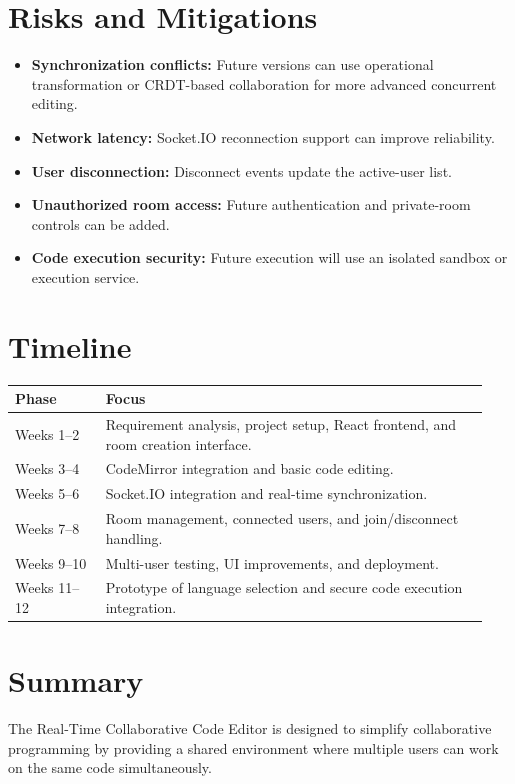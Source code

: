 \documentclass[11pt,letterpaper]{article}
\begin{document}
\section{Risks and Mitigations}
\begin{itemize}
\item \textbf{Synchronization conflicts:} Future versions can use operational transformation or CRDT-based collaboration for more advanced concurrent editing.
\item \textbf{Network latency:} Socket.IO reconnection support can improve reliability.
\item \textbf{User disconnection:} Disconnect events update the active-user list.
\item \textbf{Unauthorized room access:} Future authentication and private-room controls can be added.
\item \textbf{Code execution security:} Future execution will use an isolated sandbox or execution service.
\end{itemize}

\section{Timeline}
\begin{center}
\small
\begin{tabular}{@{}L{0.18\linewidth} L{0.76\linewidth}@{}}
\toprule
\textbf{Phase} & \textbf{Focus}\\
\midrule
Weeks 1--2 & Requirement analysis, project setup, React frontend, and room creation interface.\\
Weeks 3--4 & CodeMirror integration and basic code editing.\\
Weeks 5--6 & Socket.IO integration and real-time synchronization.\\
Weeks 7--8 & Room management, connected users, and join/disconnect handling.\\
Weeks 9--10 & Multi-user testing, UI improvements, and deployment.\\
Weeks 11--12 & Prototype of language selection and secure code execution integration.\\
\bottomrule
\end{tabular}
\end{center}

\section{Summary}
The Real-Time Collaborative Code Editor is designed to simplify collaborative programming by providing a shared environment where multiple users can work on the same code simultaneously.
\end{document}
